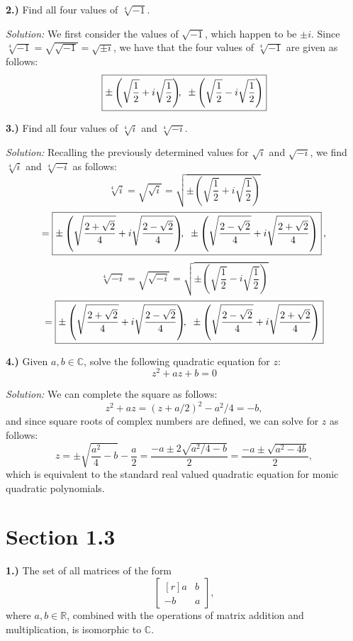 \documentclass[12pt]{article}
\newcommand{\R}{\ensuremath{\mathbb{R}}}
\newcommand{\C}{\ensuremath{\mathbb{C}}}
\newcommand{\parenb}[1]{\left(#1\right)}
\newcommand{\solution}{\textit{Solution: }}
\begin{document}
\textbf{2.)}
Find all four values of \( \sqrt[4]{-1} \).

\solution
We first consider the values of \( \sqrt{-1} \), which happen to be
\( \pm i \).
Since \( \sqrt[4]{-1} = \sqrt{\sqrt{-1}} = \sqrt{\pm i} \), we have that the
four values of \( \sqrt[4]{-1} \) are given as follows:
\[
	\boxed{
		\pm\parenb{\sqrt{\frac{1}{2}} + i\sqrt{\frac{1}{2}}}
		\kern-0.05in,\kern0.075in
		\pm\parenb{\sqrt{\frac{1}{2}} - i\sqrt{\frac{1}{2}}}
	}
\]

\textbf{3.)}
Find all four values of \( \sqrt[4]{i} \) and \( \sqrt[4]{-i} \).

\solution
Recalling the previously determined values for \( \sqrt{i} \) and
\( \sqrt{-i} \), we find \( \sqrt[4]{i} \) and \( \sqrt[4]{-i} \) as
follows:
\[
	\sqrt[4]{i}
	= \sqrt{\sqrt{i}}
	= \sqrt{\pm\parenb{\sqrt{\frac{1}{2}} + i\sqrt{\frac{1}{2}}}}
\]
\[
	= \boxed{
		\pm\parenb{
			\sqrt{\frac{2 + \sqrt{2}}{4}} + i\sqrt{\frac{2 - \sqrt{2}}{4}}
		}
		\kern-0.05in,\kern0.075in
		\pm\parenb{
			\sqrt{\frac{2 - \sqrt{2}}{4}} + i\sqrt{\frac{2 + \sqrt{2}}{4}}
		}
	}\kern0.025in,
\]
\[
	\sqrt[4]{-i}
	= \sqrt{\sqrt{-i}}
	= \sqrt{\pm\parenb{\sqrt{\frac{1}{2}} - i\sqrt{\frac{1}{2}}}}
\]
\[
	= \boxed{
		\pm\parenb{
			\sqrt{\frac{2 + \sqrt{2}}{4}} + i\sqrt{\frac{2 - \sqrt{2}}{4}}
		}
		\kern-0.05in,\kern0.075in
		\pm\parenb{
			\sqrt{\frac{2 - \sqrt{2}}{4}} + i\sqrt{\frac{2 + \sqrt{2}}{4}}
		}
	}
\]

\textbf{4.)}
Given \( a, b \in \C \), solve the following quadratic equation for \( z \):
\[
	z^2 + az + b = 0
\]

\solution
We can complete the square as follows:
\[
	z^2 + az = (z + a/2)^2 - a^2/4 = -b,
\]
and since square roots of complex numbers are defined, we can solve for
\( z \) as follows:
\[
	z = \pm\sqrt{\frac{a^2}{4} - b} - \frac{a}{2}
	= \frac{-a \pm 2\sqrt{a^2/4 - b}}{2}
	= \frac{-a \pm \sqrt{a^2 - 4b}}{2},
\]
which is equivalent to the standard real valued quadratic equation for monic
quadratic polynomials.

\section*{Section 1.3}

\textbf{1.)}
The set of all matrices of the form
\[
	\begin{bmatrix*}[r]
		a & b \\ -b & a
	\end{bmatrix*},
\]
where \( a, b \in \R \), combined with the operations of matrix addition and
multiplication, is isomorphic to \C.
\end{document}
